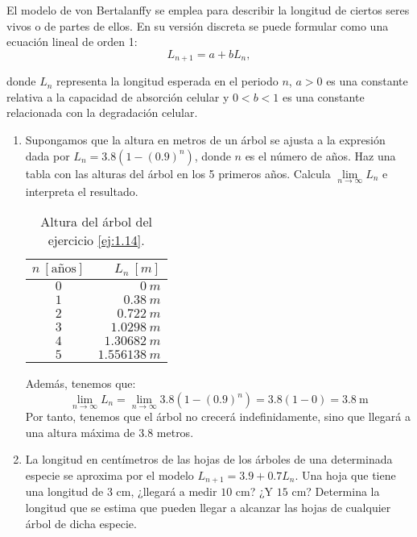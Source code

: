 \begin{ejercicio}\label{ej:1.14}
    El modelo de von Bertalanffy se emplea para describir la longitud de ciertos seres vivos o de partes de ellos. En su versión discreta se puede formular como una ecuación lineal de orden 1:
    \begin{equation*}
        L_{n+1}=a+bL_n,
    \end{equation*}

    donde $L_n$ representa la longitud esperada en el periodo $n$, $a > 0$ es una constante relativa a la capacidad de absorción celular y $0 < b < 1$ es una constante relacionada con la degradación celular.
    \begin{enumerate}
        \item Supongamos que la altura en metros de un árbol se ajusta a la expresión dada por $L_n = 3.8(1 - (0.9)^n)$, donde $n$ es el número de años. Haz una tabla con las alturas del árbol en los 5 primeros años. Calcula $\lim\limits_{n\to \infty} L_n$ e interpreta el resultado.

        \begin{table}[H]
            \centering
            \begin{tabular}{c|r}
                $n~[\text{años}]$ & $L_n~[m]$ \\ \hline
                $0$ & $0~m$\\
                $1$ & $0.38~m$\\
                $2$ & $0.722~m$ \\
                $3$ & $1.0298~m$ \\
                $4$ & $1.30682~m$ \\
                $5$ & $1.556138~m$
            \end{tabular}
            \caption{Altura del árbol del ejercicio \ref{ej:1.14}.}
        \end{table}

        Además, tenemos que:
        \begin{equation*}
            \lim_{n\to \infty} L_n = \lim_{n\to \infty} 3.8(1 - (0.9)^n) = 3.8(1-0) = 3.8~\text{m}
        \end{equation*}
        Por tanto, tenemos que el árbol no crecerá indefinidamente, sino que llegará a una altura máxima de $3.8$ metros.
        
        \item La longitud en centímetros de las hojas de los árboles de una determinada especie se aproxima por el modelo $L_{n+1} = 3.9+0.7L_n$. Una hoja que tiene una longitud de $3$ cm, ¿llegará a medir $10$ cm? ¿Y $15$ cm? Determina la longitud que se estima que pueden llegar a alcanzar las hojas de cualquier árbol de dicha especie.\\


\end{enumerate}
\end{ejercicio}
